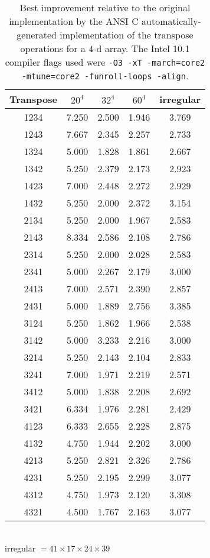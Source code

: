 \documentclass[letterpaper,12pt]{article}
\begin{document}
\begin{table}
\caption{Best improvement relative to the original implementation by the ANSI C automatically-generated implementation of the transpose operations for a $4$-d array.  The Intel 10.1 compiler flags used were \texttt{-O3 -xT -march=core2 -mtune=core2 -funroll-loops -align}.} \label{tab:spaghetty1}
\begin{center}
\begin{tabular}{ccccc}
\hline\hline
Transpose & $20^4$ & $32^4$ & $60^4$ & irregular \\
\hline
1234 & 7.250 & 2.500 & 1.946 & 3.769 \\
1243 & 7.667 & 2.345 & 2.257 & 2.733 \\
1324 & 5.000 & 1.828 & 1.861 & 2.667 \\
1342 & 5.250 & 2.379 & 2.173 & 2.923 \\
1423 & 7.000 & 2.448 & 2.272 & 2.929 \\
1432 & 5.250 & 2.000 & 2.372 & 3.154 \\
2134 & 5.250 & 2.000 & 1.967 & 2.583 \\
2143 & 8.334 & 2.586 & 2.108 & 2.786 \\
2314 & 5.250 & 2.000 & 2.028 & 2.583 \\
2341 & 5.000 & 2.267 & 2.179 & 3.000 \\
2413 & 7.000 & 2.571 & 2.390 & 2.857 \\
2431 & 5.000 & 1.889 & 2.756 & 3.385 \\
3124 & 5.250 & 1.862 & 1.966 & 2.538 \\
3142 & 5.000 & 3.233 & 2.216 & 3.000 \\
3214 & 5.250 & 2.143 & 2.104 & 2.833 \\
3241 & 7.000 & 1.971 & 2.219 & 2.571 \\
3412 & 5.000 & 1.838 & 2.208 & 2.692 \\
3421 & 6.334 & 1.976 & 2.281 & 2.429 \\
4123 & 6.333 & 2.655 & 2.228 & 2.875 \\
4132 & 4.750 & 1.944 & 2.202 & 3.000 \\
4213 & 5.250 & 2.821 & 2.326 & 2.786 \\
4231 & 5.250 & 2.195 & 2.299 & 3.077 \\
4312 & 4.750 & 1.973 & 2.120 & 3.308 \\
4321 & 4.500 & 1.767 & 2.163 & 3.077 \\
\hline\hline
\end{tabular}\\
irregular $= 41\times17\times24\times39$
\end{center}
\end{table}
\end{document}
